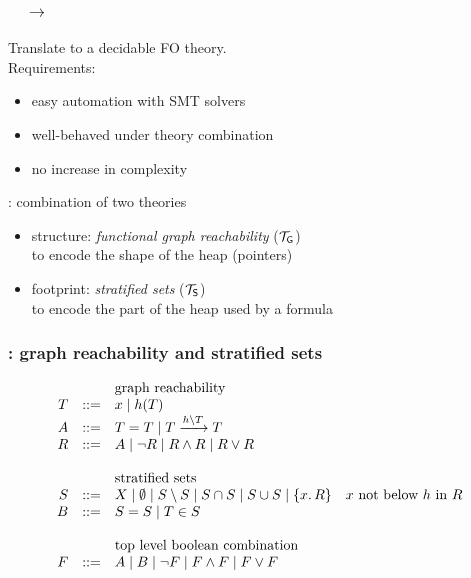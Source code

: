 \documentclass{beamer}
\begin{document}
\begin{frame}
  \frametitle{\JoshLogic $\quad \rightarrow \quad$ \LRJQ}

  Translate \JoshLogic to a decidable FO theory.\\[1ex]

  Requirements:
  \begin{itemize}
  \item easy automation with SMT solvers
  \item well-behaved under theory combination
  \item no increase in complexity
  \end{itemize}  

  \vspace{1ex}

  \LRJQ: combination of two theories
  \begin{itemize}
  \item structure: \emph{functional graph reachability} ($\mathcal{T}_{\mathsf{G}}$)\\ to encode the shape of the heap (pointers)
  \item footprint: \emph{stratified sets} ($\mathcal{T}_{\mathsf{S}}$)\\ to encode the part of the heap used by a formula
  \end{itemize}  
  

\end{frame}


\begin{frame}
  \frametitle{\LRJQ: graph reachability and stratified sets}

\begin{equation*}
\begin{array}{rcl}
  & & \text{graph reachability} \\
  T & ::= & x \mid h(T) \\
  A & ::= & T = T \mid T \xrightarrow{h \setminus T} T \\
  R & ::= & A \mid \neg R \mid R \land R \mid R \lor R \\
   & & \\
  & & \text{stratified sets} \\
  S & ::= & X \mid \emptyset \mid S \setminus S \mid S \cap S \mid S \cup S \mid \{x.\,R\} \quad \text{$x$ not below $h$ in $R$} \\
  B & ::= & S = S \mid T \in S \\
   & & \\
  & & \text{top level boolean combination} \\
  F & ::= & A \mid B \mid \lnot F \mid F \land F \mid F \lor F 
  \end{array} 
\end{equation*}

\end{frame}
\end{document}

